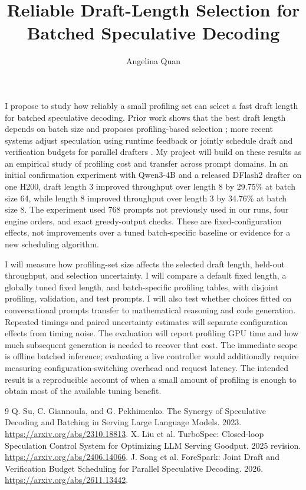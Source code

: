 \documentclass[11pt]{article}
\title{Reliable Draft-Length Selection for Batched Speculative Decoding}
\author{Angelina Quan}
\date{}
\begin{document}
\maketitle

I propose to study how reliably a small profiling set can select a fast draft length for batched speculative decoding. Prior work shows that the best draft length depends on batch size and proposes profiling-based selection \cite{su2023}; more recent systems adjust speculation using runtime feedback \cite{turbospec} or jointly schedule draft and verification budgets for parallel drafters \cite{forespark}. My project will build on these results as an empirical study of profiling cost and transfer across prompt domains. In an initial confirmation experiment with Qwen3-4B and a released DFlash2 drafter on one H200, draft length 3 improved throughput over length 8 by 29.75\% at batch size 64, while length 8 improved throughput over length 3 by 34.76\% at batch size 8. The experiment used 768 prompts not previously used in our runs, four engine orders, and exact greedy-output checks. These are fixed-configuration effects, not improvements over a tuned batch-specific baseline or evidence for a new scheduling algorithm.

I will measure how profiling-set size affects the selected draft length, held-out throughput, and selection uncertainty. I will compare a default fixed length, a globally tuned fixed length, and batch-specific profiling tables, with disjoint profiling, validation, and test prompts. I will also test whether choices fitted on conversational prompts transfer to mathematical reasoning and code generation. Repeated timings and paired uncertainty estimates will separate configuration effects from timing noise. The evaluation will report profiling GPU time and how much subsequent generation is needed to recover that cost. The immediate scope is offline batched inference; evaluating a live controller would additionally require measuring configuration-switching overhead and request latency. The intended result is a reproducible account of when a small amount of profiling is enough to obtain most of the available tuning benefit.

\begin{thebibliography}{9}
 Q. Su, C. Giannoula, and G. Pekhimenko. The Synergy of Speculative Decoding and Batching in Serving Large Language Models. 2023. \url{https://arxiv.org/abs/2310.18813}.
 X. Liu et al. TurboSpec: Closed-loop Speculation Control System for Optimizing LLM Serving Goodput. 2025 revision. \url{https://arxiv.org/abs/2406.14066}.
 J. Song et al. ForeSpark: Joint Draft and Verification Budget Scheduling for Parallel Speculative Decoding. 2026. \url{https://arxiv.org/abs/2611.13442}.
\end{thebibliography}
\end{document}
